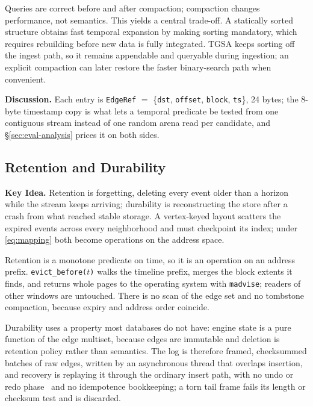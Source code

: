 \documentclass[sigconf,nonacm]{acmart}
\newcommand{\sys}{TGSA\xspace}
\begin{document}
Queries are correct before and after compaction; compaction changes
performance, not semantics. This yields a central trade-off. A
statically sorted structure obtains fast temporal expansion by making
sorting mandatory, which requires rebuilding before new data is fully
integrated. \sys keeps sorting off the ingest path, so it remains
appendable and queryable during ingestion; an explicit compaction can
later restore the faster binary-search path when convenient.

\textbf{Discussion.} Each entry is \texttt{EdgeRef} $=$
\{\texttt{dst}, \texttt{offset}, \texttt{block}, \texttt{ts}\}, 24
bytes; the 8-byte timestamp copy is what lets a temporal predicate be
tested from one contiguous stream instead of one random arena read per
candidate, and \S\ref{sec:eval-analysis} prices it on both sides.

\subsection{Retention and Durability}\label{sec:storage-ret}
\label{sec:design-durability}
\textbf{Key Idea.} Retention is forgetting, deleting every event older
than a horizon while the stream keeps arriving; durability is
reconstructing the store after a crash from what reached stable
storage. A vertex-keyed layout scatters the expired events across
every neighborhood and must checkpoint its index; under
\cref{eq:mapping} both become operations on the address space.

Retention is a monotone predicate on time, so it is an operation on
an address prefix. \texttt{evict\_before($t$)} walks the timeline
prefix, merges the block extents it finds, and returns whole pages to
the operating system with \texttt{madvise}; readers of other windows
are untouched. There is no scan of the edge set and no tombstone
compaction, because expiry and address order coincide.

Durability uses a property most databases do not have: engine state is
a pure function of the edge multiset, because edges are immutable and
deletion is retention policy rather than semantics. The log is
therefore framed, checksummed batches of raw edges, written by an
asynchronous thread that overlaps insertion, and recovery is replaying
it through the ordinary insert path, with no undo or redo
phase~\cite{mohan1992aries} and no idempotence bookkeeping; a torn tail frame fails its length or
checksum test and is discarded.
\end{document}
